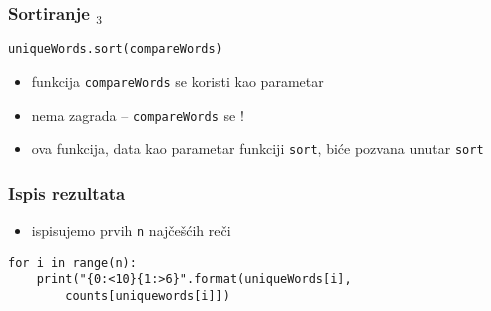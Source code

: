 \documentclass[utf8,compress,aspectratio=169]{beamer}
\begin{document}
\begin{frame}[fragile]
  \frametitle{Sortiranje $_3$}
\begin{verbatim}
uniqueWords.sort(compareWords)
\end{verbatim}
  \begin{itemize}
    \item funkcija \texttt{compareWords} se koristi kao parametar
    \item nema zagrada -- \texttt{compareWords} se !
    \item ova funkcija, data kao parametar funkciji \texttt{sort}, biće pozvana unutar \texttt{sort}
  \end{itemize}
\end{frame}

\begin{frame}[fragile]
  \frametitle{Ispis rezultata}
  \begin{itemize}
    \item ispisujemo prvih \texttt{n} najčešćih reči
  \end{itemize}
\begin{verbatim}
for i in range(n):
    print("{0:<10}{1:>6}".format(uniqueWords[i],
        counts[uniquewords[i]])
\end{verbatim}
\end{frame}
\end{document}
